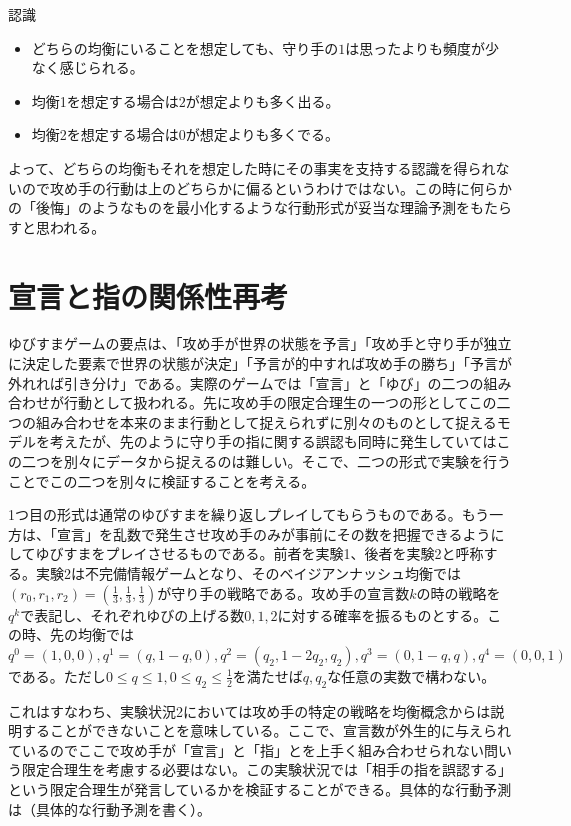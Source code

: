 \documentclass{jsarticle}
\begin{document}
\begin{itembox}[l]{認識}
	\begin{itemize}
		\item どちらの均衡にいることを想定しても、守り手の$1$は思ったよりも頻度が少なく感じられる。
		\item 均衡1を想定する場合は$2$が想定よりも多く出る。
		\item 均衡2を想定する場合は$0$が想定よりも多くでる。
	\end{itemize}
\end{itembox}

よって、どちらの均衡もそれを想定した時にその事実を支持する認識を得られないので攻め手の行動は上のどちらかに偏るというわけではない。この時に何らかの「後悔」のようなものを最小化するような行動形式が妥当な理論予測をもたらすと思われる。

\section{宣言と指の関係性再考}
ゆびすまゲームの要点は、「攻め手が世界の状態を予言」「攻め手と守り手が独立に決定した要素で世界の状態が決定」「予言が的中すれば攻め手の勝ち」「予言が外れれば引き分け」である。実際のゲームでは「宣言」と「ゆび」の二つの組み合わせが行動として扱われる。先に攻め手の限定合理生の一つの形としてこの二つの組み合わせを本来のまま行動として捉えられずに別々のものとして捉えるモデルを考えたが、先のように守り手の指に関する誤認も同時に発生していてはこの二つを別々にデータから捉えるのは難しい。そこで、二つの形式で実験を行うことでこの二つを別々に検証することを考える。

1つ目の形式は通常のゆびすまを繰り返しプレイしてもらうものである。もう一方は、「宣言」を乱数で発生させ攻め手のみが事前にその数を把握できるようにしてゆびすまをプレイさせるものである。前者を実験1、後者を実験2と呼称する。実験2は不完備情報ゲームとなり、そのベイジアンナッシュ均衡では$(r_0, r_1, r_2) = (\frac{1}{3}, \frac{1}{3}, \frac{1}{3})$が守り手の戦略である。攻め手の宣言数$k$の時の戦略を$q^k$で表記し、それぞれゆびの上げる数$0,1,2$に対する確率を振るものとする。この時、先の均衡では$q^0 = (1, 0, 0), q^1 = (q, 1-q, 0), q^2 = (q_2, 1-2q_2, q_2), q^3 = (0, 1-q, q), q^4 = (0,0,1)$である。ただし$0 \leq q \leq 1, 0\leq q_2 \leq \frac{1}{2}$を満たせば$q,q_2$な任意の実数で構わない。

これはすなわち、実験状況2においては攻め手の特定の戦略を均衡概念からは説明することができないことを意味している。ここで、宣言数が外生的に与えられているのでここで攻め手が「宣言」と「指」とを上手く組み合わせられない問いう限定合理生を考慮する必要はない。この実験状況では「相手の指を誤認する」という限定合理生が発言しているかを検証することができる。具体的な行動予測は（具体的な行動予測を書く）。
\end{document}
